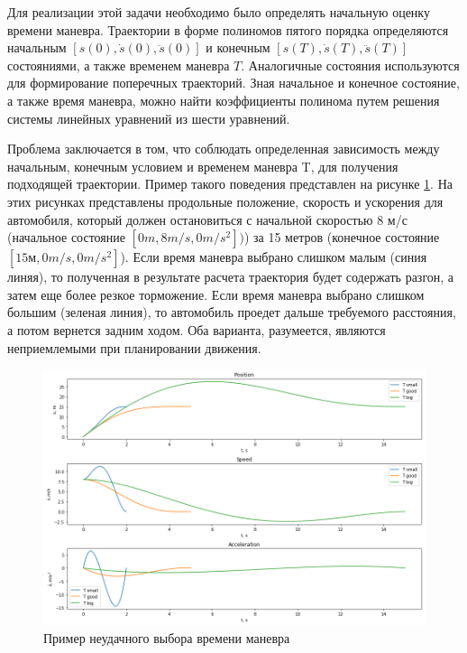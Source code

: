 Для реализации этой задачи необходимо было определять начальную оценку времени маневра. Траектории в форме
полиномов пятого порядка определяются начальным $[s(0), \dot{s}(0), \ddot{s}(0)]$ и конечным
$[s(T), \dot{s}(T), \ddot{s}(T)]$ состояниями, а также временем маневра $T$. Аналогичные состояния
используются для формирование поперечных траекторий. Зная начальное и конечное состояние, а также время
маневра, можно найти коэффициенты полинома путем решения системы линейных уравнений из шести уравнений.

Проблема заключается в том, что соблюдать определенная зависимость между начальным, конечным условием и
временем маневра T, для получения подходящей траектории. Пример такого поведения представлен на рисунке
\ref{img:t_choose_bad}. На этих рисунках представлены продольные положение, скорость и ускорения для автомобиля,
который должен остановиться с начальной скоростью 8 м/с (начальное состояние $[0 m, 8 m/s, 0 m/s^2])$) за
15 метров (конечное состояние $[15 м, 0 m/s, 0 m/s^2]$). Если время маневра выбрано слишком малым
(синия линяя), то полученная в результате расчета траектория будет содержать разгон, а затем еще более резкое торможение. Если время маневра выбрано слишком большим (зеленая линия), то автомобиль проедет дальше
требуемого расстояния, а потом вернется задним ходом. Оба варианта, разумеется, являются неприемлемыми
при планировании движения.

\begin{figure}[h]
    \centering
    \includegraphics[width=1\textwidth]{images/t_choose_bad}
    \caption{Пример неудачного выбора времени маневра}
    \label{img:t_choose_bad}
\end{figure}

